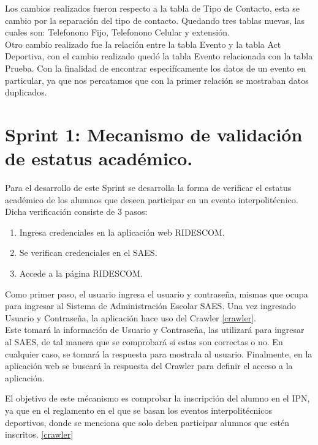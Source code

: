 	\noindent Los cambios realizados fueron respecto a la tabla de Tipo de Contacto, esta se cambio por la separación del tipo de contacto. Quedando tres tablas nuevas, las cuales son: Telefonono Fijo, Telefonono Celular y extensión. \\
	Otro cambio realizado fue la relación entre la tabla Evento y la tabla Act Deportiva, con el cambio realizado quedó la tabla Evento relacionada con la tabla Prueba. Con la finalidad de encontrar especifícamente los datos de un evento en particular, ya que nos percatamos que con la primer relación se mostraban datos duplicados. 
	
	\section{Sprint 1:  Mecanismo de validación de estatus académico.}
	\noindent Para el desarrollo de este Sprint se desarrolla la forma de verificar el estatus académico de los alumnos que deseen participar en un evento interpolitécnico. \\
	Dicha verificación consiste de 3 pasos:
	\begin{enumerate}
		\item Ingresa credenciales en la aplicación web RIDESCOM.
		\item Se verifican credenciales en el SAES.
		\item Accede a la página RIDESCOM.
	\end{enumerate}

	Como primer paso, el usuario ingresa el usuario y contraseña, mismas que ocupa para ingresar al Sistema de Administración Escolar SAES.
	Una vez ingresado Usuario y Contraseña, la aplicación hace uso del Crawler \ref{crawler}. \\
	Este tomará la información de Usuario y Contraseña, las utilizará para ingresar al SAES, de tal manera que se comprobará si estas son correctas o no. En cualquier caso, se tomará la respuesta para mostrala al usuario.
	Finalmente, en la aplicación web se buscará la respuesta del Crawler para definir el acceso a la aplicación.
	
	El objetivo de este mécanismo es comprobar la inscripción del alumno en el IPN, ya que en el reglamento en el que se basan los eventos interpolitécnicos deportivos, donde se menciona que solo deben participar alumnos que estén inscritos. \ref{crawler}
	

